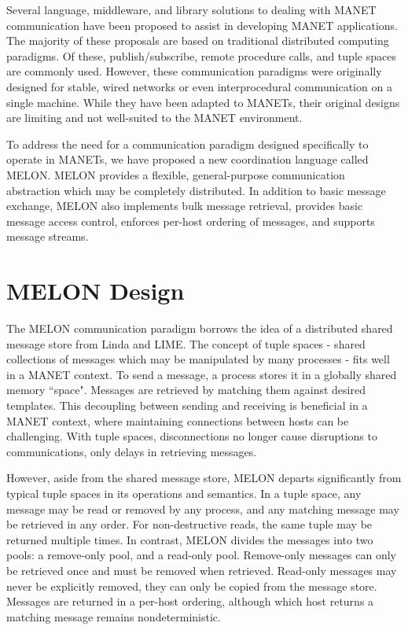 \documentclass{llncs}
\begin{document}
Several language, middleware, and library solutions to dealing with MANET communication have been proposed to assist in developing MANET applications. The majority of these proposals are based on traditional distributed computing paradigms\cite{mine}. Of these, publish/subscribe, remote procedure calls, and tuple spaces are commonly used. However, these communication paradigms were originally designed for stable, wired networks or even interprocedural communication on a single machine. While they have been adapted to MANETs, their original designs are limiting and not well-suited to the MANET environment\cite{collins2010quantitative}.

To address the need for a communication paradigm designed specifically to operate in MANETs, we have proposed a new coordination language called MELON\cite{melon}. MELON provides a flexible, general-purpose communication abstraction which may be completely distributed. In addition to basic message exchange, MELON also implements bulk message retrieval, provides basic message access control, enforces per-host ordering of messages, and supports message streams.

\section{MELON Design}\label{sec:design}

The MELON communication paradigm borrows the idea of a distributed shared message store from Linda\cite{linda} and LIME\cite{lime}. The concept of tuple spaces - shared collections of messages which may be manipulated by many processes - fits well in a MANET context. To send a message, a process stores it in a globally shared memory ``space". Messages are retrieved by matching them against desired templates. This decoupling between sending and receiving is beneficial in a MANET context, where maintaining connections between hosts can be challenging. With tuple spaces, disconnections no longer cause disruptions to communications, only delays in retrieving messages.

However, aside from the shared message store, MELON departs significantly from typical tuple spaces in its operations and semantics. In a tuple space, any message may be read or removed by any process, and any matching message may be retrieved in any order. For non-destructive reads, the same tuple may be returned multiple times. In contrast, MELON divides the messages into two pools: a remove-only pool, and a read-only pool. Remove-only messages can only be retrieved once and must be removed when retrieved. Read-only messages may never be explicitly removed, they can only be copied from the message store. Messages are returned in a per-host ordering, although which host returns a matching message remains nondeterministic.
\end{document}
